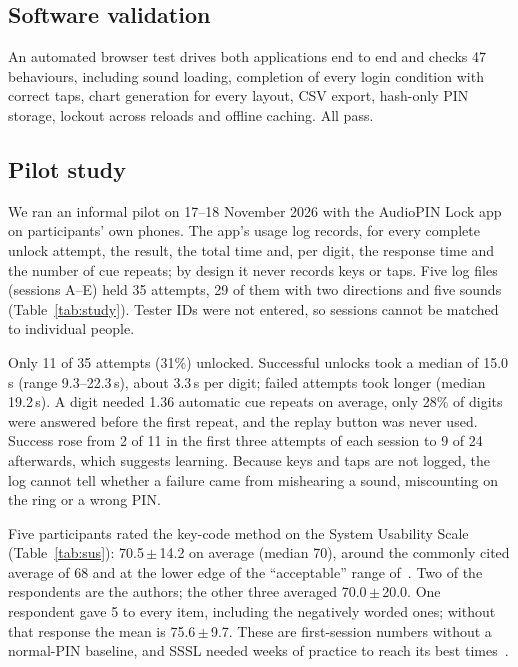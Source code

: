 \documentclass[conference]{IEEEtran}
\begin{document}
\subsection{Software validation}
An automated browser test drives both applications end to end and checks 47 behaviours, including
sound loading, completion of every login condition with correct taps, chart generation for every
layout, CSV export, hash-only PIN storage, lockout across reloads and offline caching. All pass.

\subsection{Pilot study}
We ran an informal pilot on 17--18 November 2026 with the AudioPIN Lock app on participants' own phones.
The app's usage log records, for every complete unlock attempt, the result, the total time and, per digit,
the response time and the number of cue repeats; by design it never records keys or taps. Five log files
(sessions A--E) held 35 attempts, 29 of them with two directions and five sounds (Table~\ref{tab:study}).
Tester IDs were not entered, so sessions cannot be matched to individual people.

Only 11 of 35 attempts (31\%) unlocked. Successful unlocks took a median of 15.0\,s (range 9.3--22.3\,s),
about 3.3\,s per digit; failed attempts took longer (median 19.2\,s). A digit needed 1.36 automatic cue
repeats on average, only 28\% of digits were answered before the first repeat, and the replay button was
never used. Success rose from 2 of 11 in the first three attempts of each session to 9 of 24 afterwards,
which suggests learning. Because keys and taps are not logged, the log cannot tell whether a failure came
from mishearing a sound, miscounting on the ring or a wrong PIN.

Five participants rated the key-code method on the System Usability Scale~\cite{brooke1996sus}
(Table~\ref{tab:sus}): 70.5\,$\pm$\,14.2 on average (median 70), around the commonly cited average of 68
and at the lower edge of the ``acceptable'' range of~\cite{bangor2008sus}. Two of the respondents are the authors; the other
three averaged 70.0\,$\pm$\,20.0. One respondent gave 5 to every item, including the negatively worded
ones; without that response the mean is 75.6\,$\pm$\,9.7. These are first-session numbers without a
normal-PIN baseline, and SSSL needed weeks of practice to reach its best times~\cite{perkovic2010sssl}.
\end{document}
